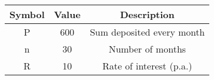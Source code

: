 \begin{tabular}{|c|c|c|}
	\hline
	\textbf{Symbol} & \textbf{Value} & \textbf{Description}		    \\
	\hline
	P 			& 600		& Sum deposited every month \\
	\hline
	n 			& 30			& Number of months		    \\
	\hline
	R 			& 10			& Rate of interest (p.a.)	    \\
	\hline
\end{tabular}